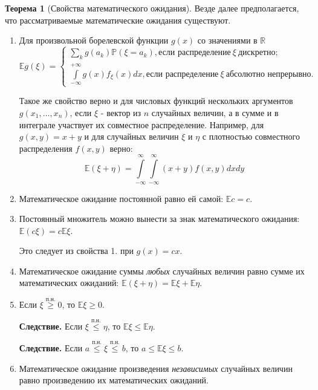 \documentclass[oneside,final,14pt]{extreport}
\newcommand\mycon{{\bf Следствие.}}
\theoremstyle{plain}
\theoremstyle{definition}
\theoremstyle{named}
\newtheorem*{namedthm}{Теорема}
\begin{document}
\begin{namedthm}[Свойства математического ожидания]
    Везде далее предполагается, что рассматриваемые математические ожидания существуют.
\begin{enumerate}
    \item Для произвольной борелевской функции $g(x)$ со значениями в $\mathbb{R}$
    $$\mathbb{E} g(\xi)=\left\{\begin{array}{l}\sum\limits_{k} g\left(a_{k}\right) \mathbb{P}\left(\xi=a_{k}\right), \text {если распределение} \: \xi \: \text {дискретно;} \\ \int\limits_{-\infty}^{+\infty} g(x) f_{\xi}(x) d x, \text {если распределение} \: \xi \: \text {абсолютно непрерывно.}\end{array}\right.$$
    
    Такое же свойство верно и для числовых функций нескольких аргументов $g(x_1, \ldots,x_n)$, если $\xi$ - вектор из $n$ случайных величин, а в сумме и в интеграле участвует их совместное распределение. Например, для $g(x,y) = x + y$ и для случайных величин $\xi$ и $\eta$ с плотностью совместного распределения $f(x,y)$ верно: 
    \begin{equation}
        \mathbb{E}(\xi+\eta)=\int\limits_{-\infty}^{\infty} \int\limits_{-\infty}^{\infty}(x+y) f(x, y) d x d y
    \end{equation}
    
    \item Математическое ожидание постоянной равно ей самой: $\mathbb{E} c=c.$
    \item Постоянный множитель можно вынести за знак математического ожидания: $\mathbb{E}(c\xi) = c\mathbb{E}\xi.$
    
    Это следует из свойства 1. при $g(x) = cx$.
    \item Математическое ожидание суммы {\it любых} случайных величин равно сумме их математических ожиданий: $\mathbb{E}(\xi + \eta) = \mathbb{E}\xi + \mathbb{E}\eta.$
    
    \item Если $\xi \overset{\text{п.н.}}{\geqslant} 0$, то $\mathbb{E}\xi \geqslant 0.$
    
    \mycon{} Если $\xi \overset{\text{п.н.}}{\leqslant} \eta$, то $\mathbb{E}\xi \leqslant \mathbb{E}\eta.$
    
    \mycon{} Если $a \overset{\text{п.н.}}{\leqslant} \xi \overset{\text{п.н.}}{\leqslant} b$, то $a \leqslant \mathbb{E}\xi \leqslant b$.
    
    \item Математическое ожидание произведения {\it независимых} случайных величин равно произведению их математических ожиданий.
    

\end{enumerate}
\end{namedthm}
\end{document}
